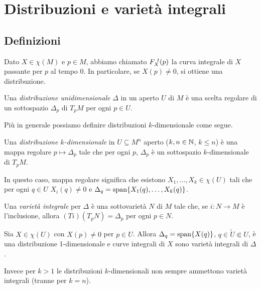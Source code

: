 \chapter{Distribuzioni e varietà integrali}


\section{Definizioni}

Dato $X\in\chi(M)$ e $p\in M$, abbiamo chiamato $F_{X}^{\ t}(p)$ la curva integrale di $X$ passante per $p$ al tempo $0$. In particolare, se $X(p)\neq 0$, si ottiene una distribuzione.

\begin{definition} 
	Una \emph{distribuzione unidimensionale} $\Delta$ in un aperto $U$ di $M$ è una scelta regolare di un sottospazio $\Delta_p$ di $T_pM$ per ogni $p\in U$.
\end{definition}

Più in generale possiamo definire distribuzioni $k$-dimensionale come segue.

\begin{definition} 
	Una \emph{distribuzione $k$-dimensionale} in $U\subseteq M^n$ aperto ($k,n\in\mathbb N$, $k\le n$) è una mappa regolare  $p\mapsto \Delta_p$ tale che per ogni $p$, $\Delta_p$ è un sottospazio $k$-dimensionale di $T_pM$.
	
	In questo caso, mappa regolare significa che esistono $X_1,\ldots,X_k\in \chi(U)$ tali che per ogni $q\in U$ $X_i(q)\ne 0$ e $\Delta_q=\mathrm{span}\{X_1(q),\ldots,X_k(q)\}$.
\end{definition}

\begin{definition} 
	Una \emph{varietà integrale} per $\Delta$ è una sottovarietà $N$ di $M$ tale che, se $i:N\to M$ è l'inclusione,
	allora $(Ti)(T_pN)=\Delta_p$ per ogni $p\in N$.
\end{definition}

\begin{example}
	Sia $X\in\chi(U)$ con $X(p)\ne 0$ per $p\in U$. Allora $\Delta_q=\mathrm{span} \{X(q)\}$, $q\in\tilde U\Subset U$, è una distribuzione 1-dimensionale e curve integrali di $X$ sono varietà integrali di $\Delta$.
\end{example}

Invece per $k>1$ le distribuzioni $k$-dimensionali non sempre ammettono varietà integrali (tranne per $k=n$).

